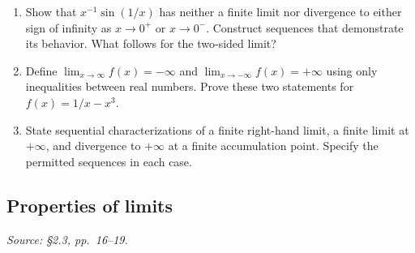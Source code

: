 \begin{enumerate}[resume]
  \item Show that \(x^{-1}\sin(1/x)\) has neither a finite limit nor
    divergence to either sign of infinity as \(x\to0^+\) or \(x\to0^-\).
    Construct sequences that demonstrate its behavior. What follows for
    the two-sided limit?

  \item Define \(\lim_{x\to\infty}f(x)=-\infty\) and
    \(\lim_{x\to-\infty}f(x)=+\infty\) using only inequalities
    between real numbers. Prove these two statements for
    \(f(x)=1/x-x^3\).

  \item State sequential characterizations of a finite right-hand
    limit, a finite limit at \(+\infty\), and divergence to \(+\infty\)
    at a finite accumulation point. Specify the permitted sequences
    in each case.
\end{enumerate}

\subsection{Properties of limits}
\textit{Source: \S2.3, pp.~16--19.}

